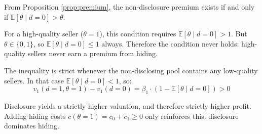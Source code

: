 From Proposition \ref{prop:premium}, the non-disclosure premium exists if and only if $\mathbb{E}[\theta \mid d=0] > \theta$.

For a high-quality seller ($\theta = 1$), this condition requires $\mathbb{E}[\theta \mid d=0] > 1$. But $\theta \in \{0, 1\}$, so $\mathbb{E}[\theta \mid d=0] \leq 1$ always. Therefore the condition never holds: high-quality sellers never earn a premium from hiding.

The inequality is strict whenever the non-disclosing pool contains any low-quality sellers. In that case $\mathbb{E}[\theta \mid d=0] < 1$, so:
\begin{equation}
    v_1(d=1, \theta=1) - v_1(d=0) = \beta_1 \cdot (1 - \mathbb{E}[\theta \mid d=0]) > 0
\end{equation}

Disclosure yields a strictly higher valuation, and therefore strictly higher profit. Adding hiding costs $c(\theta=1) = c_0 + c_1 \geq 0$ only reinforces this: disclosure dominates hiding.
